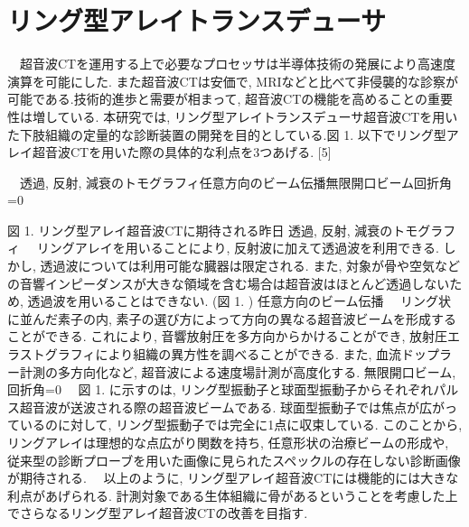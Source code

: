 \section{リング型アレイトランスデューサ} 
　超音波CTを運用する上で必要なプロセッサは半導体技術の発展により高速度演算を可能にした. また超音波CTは安価で, MRIなどと比べて非侵襲的な診察が可能である.技術的進歩と需要が相まって, 超音波CTの機能を高めることの重要性は増している.  本研究では, リング型アレイトランスデューサ超音波CTを用いた下肢組織の定量的な診断装置の開発を目的としている.図 1. 以下でリング型アレイ超音波CTを用いた際の具体的な利点を3つあげる. [5]

　透過, 反射, 減衰のトモグラフィ任意方向のビーム伝播無限開口ビーム回折角=0

図 1. リング型アレイ超音波CTに期待される昨日
 透過, 反射, 減衰のトモグラフィ
　リングアレイを用いることにより, 反射波に加えて透過波を利用できる. しかし, 透過波については利用可能な臓器は限定される. また, 対象が骨や空気などの音響インピーダンスが大きな領域を含む場合は超音波はほとんど透過しないため, 透過波を用いることはできない. (図 1. )
 任意方向のビーム伝播
　リング状に並んだ素子の内, 素子の選び方によって方向の異なる超音波ビームを形成することができる. これにより, 音響放射圧を多方向からかけることができ, 放射圧エラストグラフィにより組織の異方性を調べることができる. また, 血流ドップラー計測の多方向化など, 超音波による速度場計測が高度化する. 
 無限開口ビーム, 回折角=0
　図 1. に示すのは, リング型振動子と球面型振動子からそれぞれパルス超音波が送波される際の超音波ビームである. 球面型振動子では焦点が広がっているのに対して, リング型振動子では完全に1点に収束している. このことから, リングアレイは理想的な点広がり関数を持ち, 任意形状の治療ビームの形成や, 従来型の診断プローブを用いた画像に見られたスペックルの存在しない診断画像が期待される.
　以上のように, リング型アレイ超音波CTには機能的には大きな利点があげられる.  計測対象である生体組織に骨があるということを考慮した上でさらなるリング型アレイ超音波CTの改善を目指す. 

